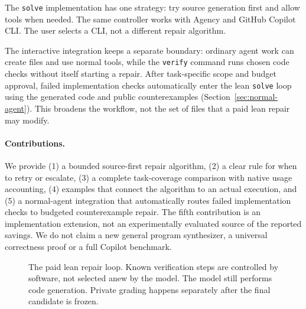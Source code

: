 \documentclass[10pt,twocolumn,a4paper]{article}
\begin{document}
The \texttt{solve} implementation has one strategy: try source generation first and allow
tools when needed. The same controller works with Agency and GitHub Copilot
CLI. The user selects a CLI, not a different repair algorithm.

The interactive integration keeps a separate boundary: ordinary agent work
can create files and use normal tools, while the \texttt{verify} command runs
chosen code checks without itself starting a repair. After task-specific scope
and budget approval, failed implementation checks automatically enter the lean
\texttt{solve} loop using the generated code and public counterexamples
(Section~\ref{sec:normal-agent}). This broadens the workflow, not the set of
files that a paid lean repair may modify.

\paragraph{Contributions.}
We provide (1) a bounded source-first repair algorithm, (2) a clear rule for
when to retry or escalate, (3) a complete task-coverage comparison with native
usage accounting, (4) examples that connect the algorithm to an actual
execution, and (5) a normal-agent integration that automatically routes failed
implementation checks to budgeted counterexample repair. The fifth contribution is an implementation extension,
not an experimentally evaluated source of the reported savings.
We do not claim a new general program synthesizer, a universal
correctness proof or a full Copilot benchmark.

\begin{figure}[t]
\centering
{}
\caption{The paid lean repair loop. Known verification steps are controlled by software,
not selected anew by the model. The model still performs code generation.
Private grading happens separately after the final candidate is frozen.}
\label{fig:overview}
\end{figure}
\end{document}
